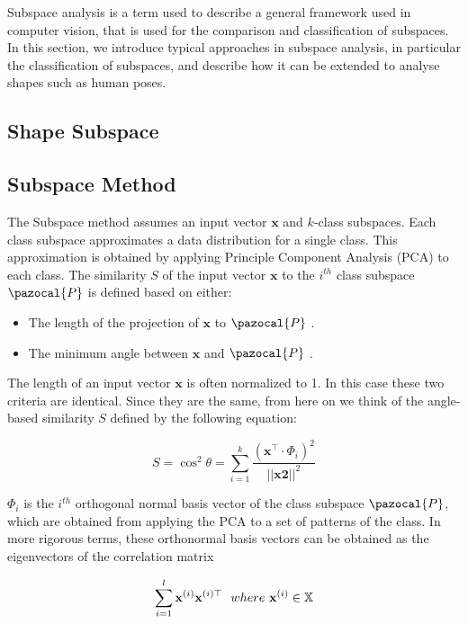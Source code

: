 Subspace analysis is a term used to describe a general framework used in computer vision, that is used for the comparison and classification of subspaces. In this section, we introduce typical approaches in subspace analysis, in particular the classification of subspaces, and describe how it can be extended to analyse shapes such as human poses.

\subsection{Shape Subspace}
\newpage

\subsection{Subspace Method}

The Subspace method assumes an input vector $\mathbf{x}$ and $k$-class subspaces. Each class subspace approximates a data distribution for a single class. This approximation is obtained by applying Principle Component Analysis (PCA) to each class. The similarity $S$ of the input vector $\mathbf{x}$ to the $i^{th}$ class subspace $\pazocal{P}$ is defined based on either:

\begin{itemize}
    \item The length of the  projection of $\mathbf{x}$ to $\pazocal{P}$ \cite{WATANABE1967EvaluationRecognition}.
    \item The minimum angle between $\mathbf{x}$ and $\pazocal{P}$ \cite{Iijima1973THEORYMETHOD.}.
\end{itemize}

The length of an input vector $\mathbf{x}$ is often normalized to 1. In this case these two criteria are identical. Since they are the same, from here on we think of the angle-based similarity $S$ defined by the following equation:

\[S = \cos^2{\theta} = \sum^{k}_{i=1} \frac{(\mathbf{x}^\top \cdot \Phi_i)^2}{||\mathbf{x2}||^2}\]

$\Phi_i$ is the $i^{th}$ orthogonal normal basis vector of the class subspace $\pazocal{P}$, which are obtained from applying the PCA to a set of patterns of the class. In more rigorous terms, these orthonormal basis vectors can be obtained as the eigenvectors of the correlation matrix

\[\sum^{l}_{i=1}\mathbf{x}^{(i)}\mathbf{x}^{(i)\top}  \ \ where \\ \ \mathbf{x}^{(i)} \in \mathbb{X} \]

